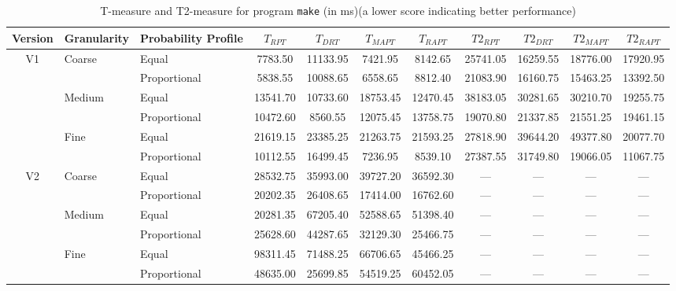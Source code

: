 \documentclass[10pt,journal,compsoc]{IEEEtran}
\begin{document}
\begin{table*}
\caption{T-measure and T2-measure for program \texttt{make} (in ms)(a lower score indicating better performance)}
\label{tab:Tmake}
\centering
\begin{tabular}{|c|l|l|c|c|c|c|c|c|c|c|} \hline
Version	& Granularity	& Probability Profile	& $T_{RPT}$	& $T_{DRT}$	& $T_{MAPT}$	& $T_{RAPT}$	& $T2_{RPT}$	& $T2_{DRT}$	& $T2_{MAPT}$	 & $T2_{RAPT}$	\\ \hline
V1	& Coarse	& Equal	& 7783.50	& 11133.95	& 7421.95	& 8142.65	& 25741.05	& 16259.55	& 18776.00	& 17920.95	 \\ \cline{3-11}
	& 	& Proportional	& 5838.55	& 10088.65	& 6558.65	& 8812.40	& 21083.90	& 16160.75	& 15463.25	& 13392.50	 \\ \cline{2-11}
	& Medium	& Equal	& 13541.70	& 10733.60	& 18753.45	& 12470.45	& 38183.05	& 30281.65	& 30210.70	& 19255.75	 \\ \cline{3-11}
	& 	& Proportional	& 10472.60	& 8560.55	& 12075.45	& 13758.75	& 19070.80	& 21337.85	& 21551.25	& 19461.15	 \\ \cline{2-11}
	& Fine	& Equal	& 21619.15	& 23385.25	& 21263.75	& 21593.25	& 27818.90	& 39644.20	& 49377.80	& 20077.70	 \\ \cline{3-11}
	& 	& Proportional	& 10112.55	& 16499.45	& 7236.95	& 8539.10	& 27387.55	& 31749.80	& 19066.05	& 11067.75	 \\ \hline
V2	& Coarse	& Equal	& 28532.75	& 35993.00	& 39727.20	& 36592.30	& ---	& ---	& ---	& ---	 \\ \cline{3-11}
	& 	& Proportional	& 20202.35	& 26408.65	& 17414.00	& 16762.60	& ---	& ---	& ---	& ---	 \\ \cline{2-11}
	& Medium	& Equal	& 20281.35	& 67205.40	& 52588.65	& 51398.40	& ---	& ---	& ---	& ---	 \\ \cline{3-11}
	& 	& Proportional	& 25628.60	& 44287.65	& 32129.30	& 25466.75	& ---	& ---	& ---	& ---	 \\ \cline{2-11}
	& Fine	& Equal	& 98311.45	& 71488.25	& 66706.65	& 45466.25	& ---	& ---	& ---	& ---	 \\ \cline{3-11}
	& 	& Proportional	& 48635.00	& 25699.85	& 54519.25	& 60452.05	& ---	& ---	& ---	& ---	 \\ \hline
\end{tabular}
\end{table*}
\end{document}
